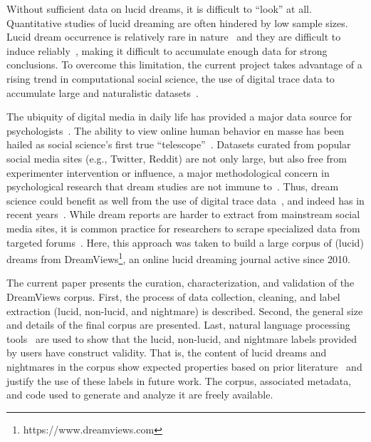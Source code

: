 \documentclass[10pt,a4paper,twocolumn]{article}
\begin{document}
\par
Without sufficient data on lucid dreams, it is difficult to ``look'' at all. Quantitative studies of lucid dreaming are often hindered by low sample sizes. Lucid dream occurrence is relatively rare in nature~\cite{saunders2016} and they are difficult to induce reliably~\cite{stumbrys2012}, making it difficult to accumulate enough data for strong conclusions. To overcome this limitation, the current project takes advantage of a rising trend in computational social science, the use of digital trace data to accumulate large and naturalistic datasets~\cite{lazer2021}.

\par
The ubiquity of digital media in daily life has provided a major data source for psychologists~\cite{lazer2021,shah2015,kern2016,gosling2015,rafaeli2019,heng2018}. The ability to view online human behavior en masse has been hailed as social science's first true ``telescope''~\cite{jungherr2017}. Datasets curated from popular social media sites (e.g., Twitter, Reddit) are not only large, but also free from experimenter intervention or influence, a major methodological concern in psychological research that dream studies are not immune to~\cite{picard2021, schredl2002}. Thus, dream science could benefit as well from the use of digital trace data~\cite{bulkeley2017}, and indeed has in recent years~\cite{sanz2018, niederhoffer2017, elce2021}. While dream reports are harder to extract from mainstream social media sites, it is common practice for researchers to scrape specialized data from targeted forums~\cite{speckmann2021}. Here, this approach was taken to build a large corpus of (lucid) dreams from DreamViews\footnote{https://www.dreamviews.com}, an online lucid dreaming journal active since 2010.

\par
The current paper presents the curation, characterization, and validation of the DreamViews corpus. First, the process of data collection, cleaning, and label extraction (lucid, non-lucid, and nightmare) is described. Second, the general size and details of the final corpus are presented. Last, natural language processing tools~\cite{hirschberg2015,elce2021} are used to show that the lucid, non-lucid, and nightmare labels provided by users have construct validity. That is, the content of lucid dreams and nightmares in the corpus show expected properties based on prior literature~\cite{voss2013,paquet2020} and justify the use of these labels in future work. The corpus, associated metadata, and code used to generate and analyze it are freely available.
\end{document}
